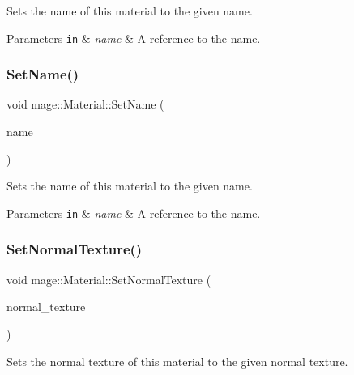 Sets the name of this material to the given name.


\begin{DoxyParams}[1]{Parameters}
\mbox{\tt in}  & {\em name} & A reference to the name. \\
\hline
\end{DoxyParams}
\hypertarget{structmage_1_1_material_ad612e4174b030bb002cedaf054e18f82}{}\label{structmage_1_1_material_ad612e4174b030bb002cedaf054e18f82} 
\subsubsection{\texorpdfstring{Set\+Name()}{SetName()}\hspace{0.1cm}{\footnotesize\ttfamily [2/2]}}
{\footnotesize\ttfamily void mage\+::\+Material\+::\+Set\+Name (\begin{DoxyParamCaption}\item[{string \&\&}]{name }\end{DoxyParamCaption})}

Sets the name of this material to the given name.


\begin{DoxyParams}[1]{Parameters}
\mbox{\tt in}  & {\em name} & A reference to the name. \\
\hline
\end{DoxyParams}
\hypertarget{structmage_1_1_material_a178b5b945137d7aab35db01a2e52ab31}{}\label{structmage_1_1_material_a178b5b945137d7aab35db01a2e52ab31} 
\subsubsection{\texorpdfstring{Set\+Normal\+Texture()}{SetNormalTexture()}}
{\footnotesize\ttfamily void mage\+::\+Material\+::\+Set\+Normal\+Texture (\begin{DoxyParamCaption}\item[{const \hyperlink{namespacemage_a1e01ae66713838a7a67d30e44c67703e}{Shared\+Ptr}$<$ const \hyperlink{classmage_1_1_texture}{Texture} $>$ \&}]{normal\+\_\+texture }\end{DoxyParamCaption})}

Sets the normal texture of this material to the given normal texture.


